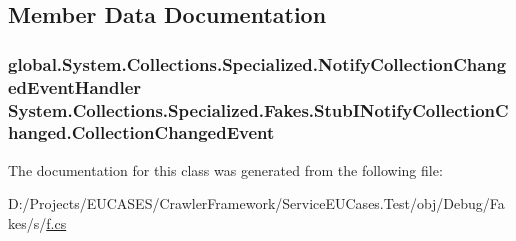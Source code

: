\subsection{Member Data Documentation}
\hypertarget{class_system_1_1_collections_1_1_specialized_1_1_fakes_1_1_stub_i_notify_collection_changed_a8805cc17a7085732e17e04dc5b7fecac}{
\subsubsection[{Collection\-Changed\-Event}]{\setlength{\rightskip}{0pt plus 5cm}global.\-System.\-Collections.\-Specialized.\-Notify\-Collection\-Changed\-Event\-Handler System.\-Collections.\-Specialized.\-Fakes.\-Stub\-I\-Notify\-Collection\-Changed.\-Collection\-Changed\-Event}}\label{class_system_1_1_collections_1_1_specialized_1_1_fakes_1_1_stub_i_notify_collection_changed_a8805cc17a7085732e17e04dc5b7fecac}


The documentation for this class was generated from the following file\-:\begin{DoxyCompactItemize}
\item 
D\-:/\-Projects/\-E\-U\-C\-A\-S\-E\-S/\-Crawler\-Framework/\-Service\-E\-U\-Cases.\-Test/obj/\-Debug/\-Fakes/s/\hyperlink{s_2f_8cs}{f.\-cs}\end{DoxyCompactItemize}
